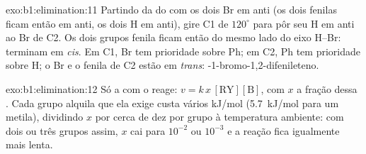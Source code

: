 \begin{solution}{exo:b1:elimination:11}
Partindo da  do  com os dois Br em anti (os dois
fenilas ficam então em anti, os dois H em anti), gire C1 de $120^\circ$
para pôr seu H em anti ao Br de C2. Os dois grupos fenila ficam então do
mesmo lado do eixo H--Br: terminam em \textit{cis}. Em C1, Br tem
prioridade sobre Ph; em C2, Ph tem prioridade sobre H; o Br e o fenila
de C2 estão em \textit{trans}: -1-bromo-1,2-difenileteno.
\end{solution}

\begin{solution}{exo:b1:elimination:12}
Só a  com o   reage: $v = k\,x\,[\mathrm{RY}][\mathrm{B}]$,
com $x$ a fração dessa . Cada grupo alquila  que ela exige
custa vários kJ/mol (\qty{5.7}{kJ/mol} para um metila), dividindo $x$
por cerca de dez por grupo à temperatura ambiente: com dois ou três
grupos assim, $x$ cai para $10^{-2}$ ou $10^{-3}$ e a reação fica
igualmente mais lenta.
\end{solution}

